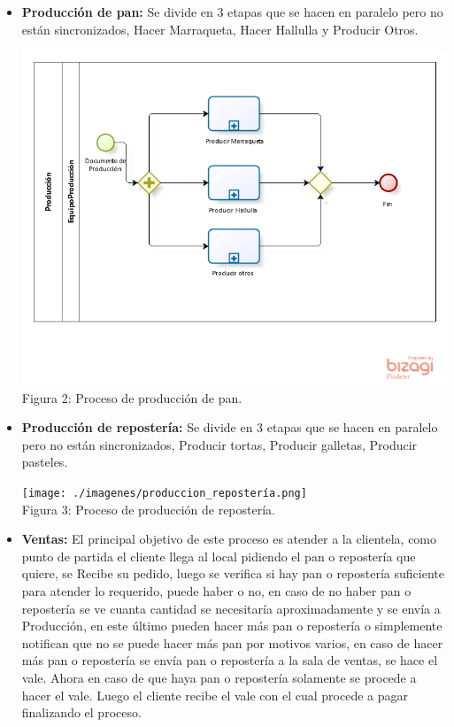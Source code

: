 \begin{itemize}

\item \textbf{Producción de pan:} Se divide en 3 etapas que se hacen en paralelo pero no están sincronizados, Hacer Marraqueta, Hacer Hallulla y Producir Otros.

\begin{center}
\includegraphics[width=13cm]{./imagenes/produccion_pan.png}\\
Figura 2: Proceso de producción de pan.
\end{center}

\item \textbf{Producción de repostería:} Se divide en 3 etapas que se hacen en paralelo pero no están sincronizados, Producir tortas, Producir galletas, Producir pasteles.

\begin{center}
\texttt{[image: ./imagenes/produccion\_repostería.png]}\\
Figura 3: Proceso de producción de repostería.
\end{center}

\item \textbf{Ventas:} El principal objetivo de este proceso es atender a la clientela, como punto de partida el cliente llega al local pidiendo el pan o repostería que quiere, se Recibe su pedido, luego se verifica si hay pan o repostería suficiente para atender lo requerido, puede haber o no, en caso de no haber pan o repostería se ve cuanta cantidad se necesitaría aproximadamente y se envía a Producción, en este último pueden hacer más pan o repostería o simplemente notifican que no se puede hacer más pan por motivos varios, en caso de hacer más pan o repostería se envía pan o repostería a la sala de ventas, se hace el vale. Ahora en caso de que haya pan o repostería solamente se procede a hacer el vale. Luego el cliente recibe el vale con el cual procede a pagar finalizando el proceso.


\end{itemize}
